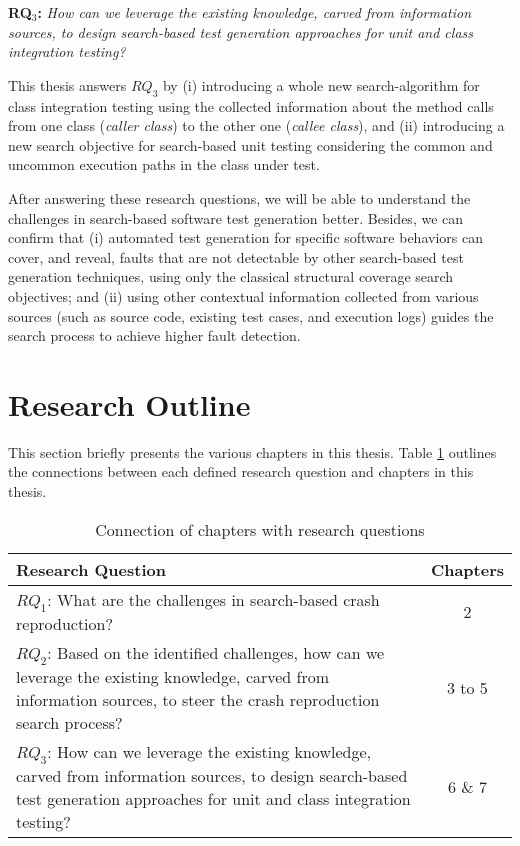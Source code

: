 \begin{framed}
    \textbf{RQ$_3$: } \textit{How can we leverage the existing knowledge, carved from information sources, to design search-based test generation approaches for unit and class integration testing?}
\end{framed}

This thesis answers $RQ_3$ by (i) introducing a whole new search-algorithm for class integration testing using the collected information about the method calls from one class (\textit{caller class}) to the other one (\textit{callee class}), and (ii) introducing a new search objective for search-based unit testing considering the common and uncommon execution paths in the class under test.

After answering these research questions, we will be able to understand the challenges in search-based software test generation better. Besides, we can confirm that (i) automated test generation for specific software behaviors can cover, and reveal, faults that are not detectable by other search-based test generation techniques, using only the classical structural coverage search objectives; and (ii) using other contextual information collected from various sources (such as source code, existing test cases, and execution logs) guides the search process to achieve higher fault detection.





\section{Research Outline}

This section briefly presents the various chapters in this thesis.
Table \ref{tab:chaptersvsRQs} outlines the connections between each defined research question and chapters in this thesis.


\begin{table}[!t]
\caption{Connection of chapters with research questions}
\label{tab:chaptersvsRQs}
\begin{tabular}{|p{}||c|}
\textbf{Research Question} & \textbf{Chapters}\\
\hline
\hline
$RQ_1$: What are the challenges in search-based crash reproduction? & 2\\
$RQ_2$: Based on the identified challenges, how can we leverage the existing knowledge, carved from information sources, to steer the crash reproduction search process? & 3 to 5\\
$RQ_3$: How can we leverage the existing knowledge, carved from information sources, to design search-based test generation approaches for unit and class integration testing? & 6 \& 7\\
\hline
\end{tabular}
\end{table}


